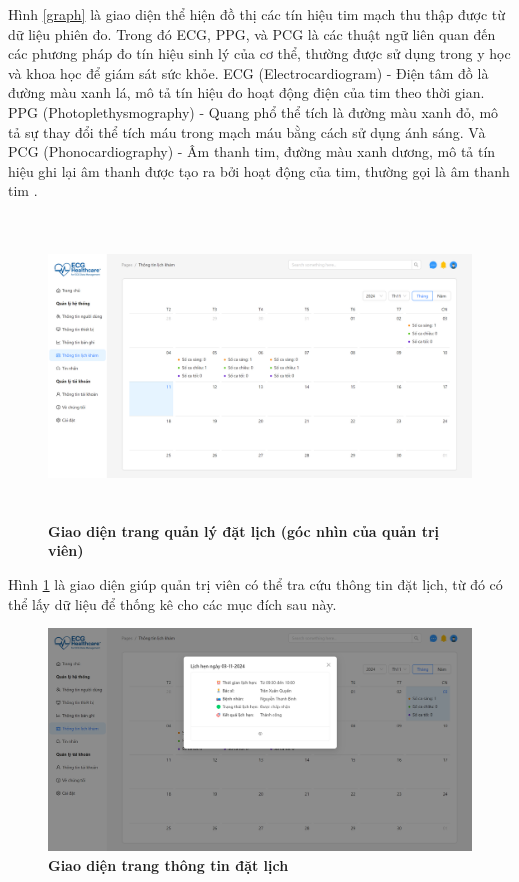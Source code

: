 Hình \ref{graph} là giao diện thể hiện đồ thị các tín hiệu tim mạch thu thập được từ dữ liệu phiên đo.
Trong đó ECG, PPG, và PCG là các thuật ngữ liên quan đến các phương pháp đo tín hiệu sinh lý của cơ thể, thường được sử dụng trong y học và khoa học để giám sát sức khỏe.
ECG (Electrocardiogram) - Điện tâm đồ là đường màu xanh lá, mô tả tín hiệu đo hoạt động điện của tim theo thời gian.
PPG (Photoplethysmography) - Quang phổ thể tích là đường màu xanh đỏ, mô tả sự thay đổi thể tích máu trong mạch máu bằng cách sử dụng ánh sáng.
Và PCG (Phonocardiography) - Âm thanh tim, đường màu xanh dương, mô tả tín hiệu ghi lại âm thanh được tạo ra bởi hoạt động của tim, thường gọi là âm thanh tim \cite{ecg_pcg_ppg}.
\begin{figure}[H]
	\centering
	\includegraphics[width=15cm,height=8cm]{Images/admin_ui/schedule.png}
	\caption[Giao diện trang quản lý đặt lịch]{\bfseries \fontsize{12pt}{0pt}\selectfont Giao diện trang quản lý đặt lịch (góc nhìn của quản trị viên)}
	\label{schedules-admin}
\end{figure}

Hình \ref{schedules-admin} là giao diện giúp quản trị viên có thể tra cứu thông tin đặt lịch, từ đó có thể lấy dữ liệu để thống kê cho các mục đích sau này.
\begin{figure}[H]
	\centering
	\includegraphics[width=12cm]{Images/admin_ui/schedule-info.png}
	\caption[Giao diện trang thông tin đặt lịch]{\bfseries \fontsize{12pt}{0pt}\selectfont Giao diện trang thông tin đặt lịch}
	\label{schedule-info-admin}
\end{figure}

